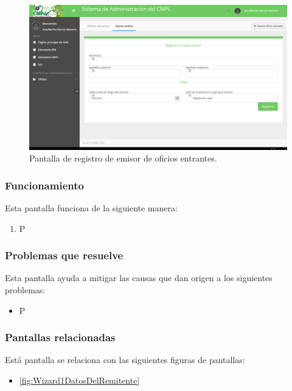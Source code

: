	\begin{figure}[htbp!]
		\centering
			\includegraphics[width=1\textwidth]{Pantallas/NuevoEmisor.png}
		\caption{Pantalla de registro de emisor de oficios entrantes.}
		\label{fig:NuevoEmisor}
	\end{figure}

\subsubsection{Funcionamiento}
	Esta pantalla funciona de la siguiente manera:
	
	\begin{enumerate}
		\item P
	\end{enumerate}

\subsubsection{Problemas que resuelve}
Esta pantalla ayuda a mitigar las causas que dan origen a los siguientes problemas:

	\begin{itemize}
		\item P
	\end{itemize}

\subsubsection{Pantallas relacionadas}
Está pantalla se relaciona con las siguientes figuras de pantallas:
	\begin{itemize}
		\item \ref{fig:Wizard1DatosDelRemitente}
	\end{itemize}

